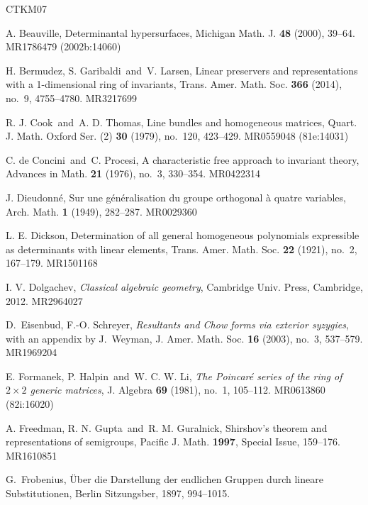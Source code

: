 \documentclass[12pt]{amsart}
\numberwithin{equation}{section}
\numberwithin{subsection}{section}
\theoremstyle{definition} \newtheorem{definition}[theorem]{Definition}
\begin{document}
\begin{thebibliography}{CTKM07}


A. Beauville, Determinantal hypersurfaces, 
Michigan Math. J. {\bf 48} (2000), 39--64. MR1786479 (2002b:14060)

H. Bermudez, S. Garibaldi\ and\ V. Larsen, Linear preservers and representations with a 1-dimensional ring of invariants, Trans. Amer. Math. Soc. {\bf 366} (2014), no.~9, 4755--4780. MR3217699 
  
R. J. Cook\ and\ A. D. Thomas, Line bundles and homogeneous matrices, Quart. J. Math. Oxford Ser. (2) {\bf 30} (1979), no.~120, 423--429. MR0559048 (81e:14031)

C. de Concini\ and\ C. Procesi, A characteristic free approach to invariant theory, Advances in Math. {\bf 21} (1976), no.~3, 330--354. MR0422314

J. Dieudonn\'e, Sur une g\'en\'eralisation du groupe orthogonal \`a quatre variables, Arch. Math. {\bf 1} (1949), 282--287. MR0029360

L. E. Dickson, Determination of all general homogeneous polynomials expressible as determinants with linear elements, Trans. Amer. Math. Soc. {\bf 22} (1921), no.~2, 167--179. MR1501168

I. V. Dolgachev, {\it Classical algebraic geometry}, Cambridge 
Univ. Press, Cambridge, 2012. MR2964027

D.~Eisenbud, F.-O. Schreyer, {\em Resultants and Chow forms 
via exterior syzygies}, with an appendix by J.~Weyman,
J. Amer. Math. Soc. {\bf 16} (2003), no.~3, 537--579. MR1969204

E. Formanek, P. Halpin\ and\ W. C. W. Li, {\em The Poincar\'e series 
of the ring of $2\times 2$ generic matrices}, J. Algebra {\bf 69} (1981), 
no.~1, 105--112. MR0613860 (82i:16020)

A. Freedman, R. N. Gupta\ and\ R. M. Guralnick, Shirshov's 
theorem and representations of semigroups, Pacific J. Math. 
{\bf 1997}, Special Issue, 159--176. MR1610851

G.~Frobenius, \"Uber die Darstellung der endlichen Gruppen durch 
lineare Substitutionen, Berlin Sitzungsber, 1897, 994--1015. 


\end{thebibliography}
\end{document}
